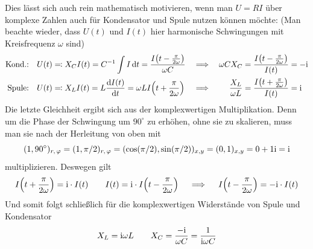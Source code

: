 Dies lässt sich auch rein mathematisch motivieren, wenn man $U = RI$ über komplexe Zahlen auch für Kondensator und Spule nutzen können möchte:
(Man beachte wieder, dass $U(t)$ und $I(t)$ hier harmonische Schwingungen mit Kreisfrequenz $\omega$ sind)
\begin{align*}
    \text{Kond.:}&& U(t) &\eqqcolon X_CI(t) = C^{-1} \int I \dd{t} = \frac{I\qty(t - \frac{\pi}{2\omega})}{\omega C} & \implies && \omega C X_C  &= \frac{I\qty(t - \frac{\pi}{2\omega})}{I(t)} = -\mathrm{i} \\
    \text{Spule:}&& U(t) &\eqqcolon X_LI(t) = L \dv{I(t)}{t} = \omega L I\qty(t + \frac{\pi}{2\omega}) & \implies && \frac{X_L}{\omega L} &= \frac{I\qty(t + \frac{\pi}{2\omega})}{I(t)} = \mathrm{i}
\end{align*} 
Die letzte Gleichheit ergibt sich aus der komplexwertigen Multiplikation.
Denn um die Phase der Schwingung um $90^\circ$ zu erhöhen, ohne sie zu skalieren, muss man sie nach der Herleitung von oben mit $$(1,90^\circ)_{r,\,\varphi} = (1,\pi/2)_{r,\,\varphi} = (\cos(\pi/2), \sin(\pi/2))_{x,y} = (0, 1)_{x,y} = 0 + 1 \mathrm{i} = \mathrm{i}$$ multiplizieren. Deswegen gilt 
$$I\qty(t + \frac{\pi}{2\omega}) = \mathrm{i} \cdot I(t) \qquad I(t) = \mathrm{i} \cdot I\qty(t - \frac{\pi}{2\omega})
\quad \implies \quad I\qty(t - \frac{\pi}{2\omega}) = -\mathrm{i} \cdot I\qty(t)$$
Und somit folgt schließlich für die komplexwertigen Widerstände von Spule und Kondensator
$$X_L = \mathrm{i} \omega L \qquad X_C = \frac{-\mathrm{i}}{\omega C} = \frac{1}{\mathrm{i} \omega C}$$

